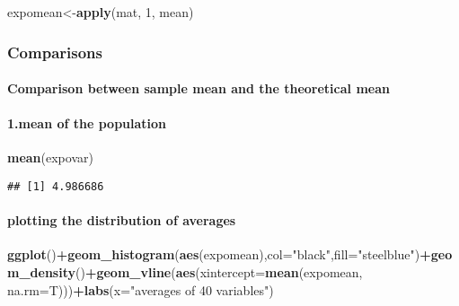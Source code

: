 \documentclass[]{article}
\newenvironment{Shaded}{\begin{snugshade}}{\end{snugshade}}
\newcommand{\KeywordTok}[1]{\textcolor[rgb]{0.13,0.29,0.53}{\textbf{#1}}}
\newcommand{\DataTypeTok}[1]{\textcolor[rgb]{0.13,0.29,0.53}{#1}}
\newcommand{\DecValTok}[1]{\textcolor[rgb]{0.00,0.00,0.81}{#1}}
\newcommand{\StringTok}[1]{\textcolor[rgb]{0.31,0.60,0.02}{#1}}
\newcommand{\OperatorTok}[1]{\textcolor[rgb]{0.81,0.36,0.00}{\textbf{#1}}}
\newcommand{\NormalTok}[1]{#1}
\let\oldparagraph\paragraph
\renewcommand{\paragraph}[1]{\oldparagraph{#1}\mbox{}}
\begin{document}
\begin{Shaded}
\begin{Highlighting}[]
\NormalTok{expomean<-}\KeywordTok{apply}\NormalTok{(mat, }\DecValTok{1}\NormalTok{, mean)}
\end{Highlighting}
\end{Shaded}

\subsubsection{Comparisons}\label{comparisons}

\paragraph{Comparison between sample mean and the theoretical
mean}\label{comparison-between-sample-mean-and-the-theoretical-mean}

\paragraph{1.mean of the population}\label{mean-of-the-population}

\begin{Shaded}
\begin{Highlighting}[]
\KeywordTok{mean}\NormalTok{(expovar)}
\end{Highlighting}
\end{Shaded}

\begin{verbatim}
## [1] 4.986686
\end{verbatim}

\paragraph{plotting the distribution of
averages}\label{plotting-the-distribution-of-averages}

\begin{Shaded}
\begin{Highlighting}[]
\KeywordTok{ggplot}\NormalTok{()}\OperatorTok{+}\KeywordTok{geom_histogram}\NormalTok{(}\KeywordTok{aes}\NormalTok{(expomean),}\DataTypeTok{col=}\StringTok{"black"}\NormalTok{,}\DataTypeTok{fill=}\StringTok{"steelblue"}\NormalTok{)}\OperatorTok{+}\KeywordTok{geom_density}\NormalTok{()}\OperatorTok{+}\KeywordTok{geom_vline}\NormalTok{(}\KeywordTok{aes}\NormalTok{(}\DataTypeTok{xintercept=}\KeywordTok{mean}\NormalTok{(expomean, }\DataTypeTok{na.rm=}\NormalTok{T)))}\OperatorTok{+}\KeywordTok{labs}\NormalTok{(}\DataTypeTok{x=}\StringTok{"averages of 40 variables"}\NormalTok{)}
\end{Highlighting}
\end{Shaded}
\end{document}
